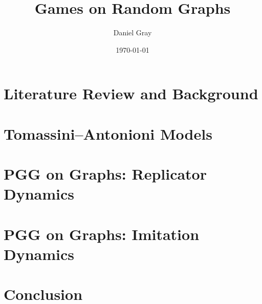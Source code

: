 \documentclass[12pt,twoside]{report}
\title{Games on Random Graphs}
\author{Daniel Gray}
\date{\today}
\begin{document}


%




\tableofcontents




\chapter{Literature Review and Background} \label{Chapter:Lit}

\chapter{Tomassini--Antonioni Models} \label{TA}


\chapter{PGG on Graphs: Replicator Dynamics} 
\label{Chapter:Rep}

\chapter{PGG on Graphs: Imitation Dynamics} 
\label{Chapter:ID}



\chapter{Conclusion} \label{Conclusion}


%

\printbibliography
\end{document}
